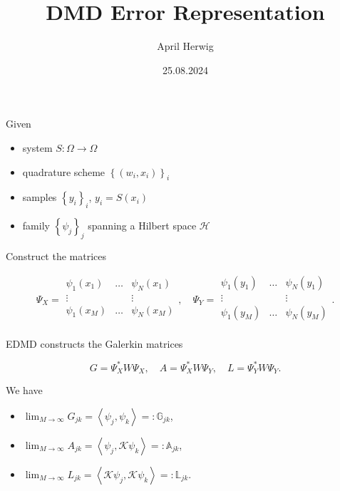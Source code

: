 \documentclass[a4paper]{article}
\title{\vspace*{-5ex}DMD Error Representation}
\author{\vspace*{-15ex}April Herwig}
\date{25.08.2024}
\theoremstyle{definition}
\theoremstyle{remark}
\theoremstyle{remark}
\begin{document}
\maketitle


Given

\begin{itemize}
    \item system $S : \Omega \to \Omega$
    \item quadrature scheme $\left\{ (w_i, x_i) \right\}_i$
    \item samples $\left\{ y_i \right\}_i$, $y_i = S(x_i)$
    \item family $\left\{ \psi_j \right\}_j$ spanning a Hilbert space $\mathcal{H}$
\end{itemize}

Construct the matrices

\begin{equation*}
    \Psi_X = \begin{matrix}
        \psi_1 (x_1) & \ldots & \psi_N (x_1) \\
        \vdots & & \vdots \\
        \psi_1 (x_M) & \ldots & \psi_N (x_M) \\
    \end{matrix}
    , \quad 
    \Psi_Y = \begin{matrix}
        \psi_1 (y_1) & \ldots & \psi_N (y_1) \\
        \vdots & & \vdots \\
        \psi_1 (y_M) & \ldots & \psi_N (y_M) \\
    \end{matrix}
    .
\end{equation*}

EDMD constructs the Galerkin matrices 

\begin{equation*}
    G = \Psi_X^* W \Psi_X, \quad A = \Psi_X^* W \Psi_Y, \quad L = \Psi_Y^* W \Psi_Y. 
\end{equation*}

We have 

\begin{itemize}
    \item $\lim_{M \to \infty} G_{j k} = \left\langle \psi_j, \psi_k \right\rangle =: \mathbb{G}_{j k}$,
    \item $\lim_{M \to \infty} A_{j k} = \left\langle \psi_j, \mathcal{K}\psi_k \right\rangle =: \mathbb{A}_{j k}$,
    \item $\lim_{M \to \infty} L_{j k} = \left\langle \mathcal{K}\psi_j, \mathcal{K}\psi_k \right\rangle =: \mathbb{L}_{j k}$.
\end{itemize}
\end{document}
